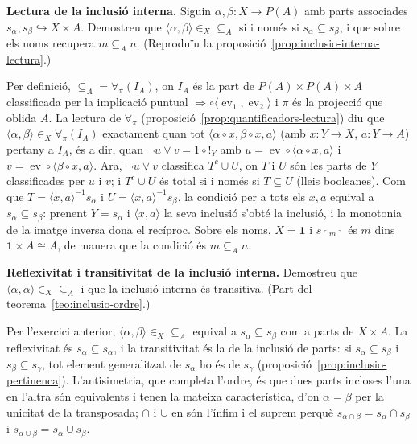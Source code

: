 \begin{exercici}
\textbf{Lectura de la inclusió interna.} Siguin \(\alpha,\beta\colon X\to P(A)\) amb parts associades \(s_\alpha,s_\beta\hookrightarrow X\times A\). Demostreu que \(\langle\alpha,\beta\rangle\in_X{\subseteq_A}\) si i només si \(s_\alpha\subseteq s_\beta\), i que sobre els noms recupera \(m\subseteq_A n\). (Reproduïu la proposició~\ref{prop:inclusio-interna-lectura}.)
\end{exercici}
\begin{solucio}
Per definició, \(\subseteq_A=\forall_\pi(I_A)\), on \(I_A\) és la part de \(P(A)\times P(A)\times A\) classificada per la implicació puntual \(\Rightarrow\circ\langle\operatorname{ev}_1,\operatorname{ev}_2\rangle\) i \(\pi\) és la projecció que oblida \(A\). La lectura de \(\forall_\pi\) (proposició~\ref{prop:quantificadors-lectura}) diu que \(\langle\alpha,\beta\rangle\in_X\forall_\pi(I_A)\) exactament quan tot \(\langle\alpha\circ x,\beta\circ x,a\rangle\) (amb \(x\colon Y\to X\), \(a\colon Y\to A\)) pertany a \(I_A\), és a dir, quan \(\neg u\vee v=1\circ{!}_Y\) amb \(u=\operatorname{ev}\circ\langle\alpha\circ x,a\rangle\) i \(v=\operatorname{ev}\circ\langle\beta\circ x,a\rangle\). Ara, \(\neg u\vee v\) classifica \(T^c\cup U\), on \(T\) i \(U\) són les parts de \(Y\) classificades per \(u\) i \(v\); i \(T^c\cup U\) és total si i només si \(T\subseteq U\) (lleis booleanes). Com que \(T=\langle x,a\rangle^{-1}s_\alpha\) i \(U=\langle x,a\rangle^{-1}s_\beta\), la condició per a tots els \(x,a\) equival a \(s_\alpha\subseteq s_\beta\): prenent \(Y=s_\alpha\) i \(\langle x,a\rangle\) la seva inclusió s'obté la inclusió, i la monotonia de la imatge inversa dona el recíproc. Sobre els noms, \(X=\mathbf1\) i \(s_{\ulcorner m\urcorner}\) és \(m\) dins \(\mathbf1\times A\cong A\), de manera que la condició és \(m\subseteq_A n\).
\end{solucio}

\begin{exercici}
\textbf{Reflexivitat i transitivitat de la inclusió interna.} Demostreu que \(\langle\alpha,\alpha\rangle\in_X{\subseteq_A}\) i que la inclusió interna és transitiva. (Part del teorema~\ref{teo:inclusio-ordre}.)
\end{exercici}
\begin{solucio}
Per l'exercici anterior, \(\langle\alpha,\beta\rangle\in_X{\subseteq_A}\) equival a \(s_\alpha\subseteq s_\beta\) com a parts de \(X\times A\). La reflexivitat és \(s_\alpha\subseteq s_\alpha\), i la transitivitat és la de la inclusió de parts: si \(s_\alpha\subseteq s_\beta\) i \(s_\beta\subseteq s_\gamma\), tot element generalitzat de \(s_\alpha\) ho és de \(s_\gamma\) (proposició~\ref{prop:inclusio-pertinenca}). L'antisimetria, que completa l'ordre, és que dues parts incloses l'una en l'altra són equivalents i tenen la mateixa característica, d'on \(\alpha=\beta\) per la unicitat de la transposada; \(\cap\) i \(\cup\) en són l'ínfim i el suprem perquè \(s_{\alpha\cap\beta}=s_\alpha\cap s_\beta\) i \(s_{\alpha\cup\beta}=s_\alpha\cup s_\beta\).
\end{solucio}


